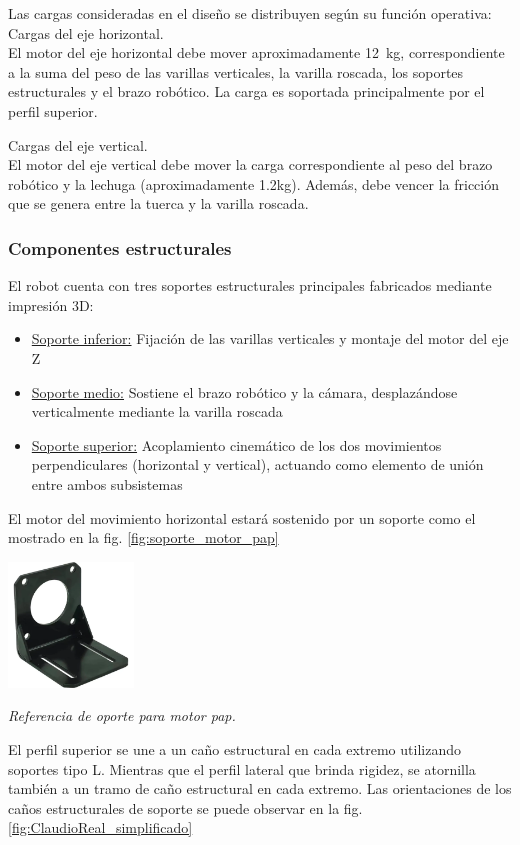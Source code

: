 Las cargas consideradas en el diseño se distribuyen según su función operativa:\\

Cargas del eje horizontal.\\
\noindent
El motor del eje horizontal debe mover aproximadamente 12~kg, correspondiente a la suma del peso de las varillas verticales, la varilla roscada, los soportes estructurales y el brazo robótico. La carga es soportada principalmente por el perfil superior.

Cargas del eje vertical.\\
\noindent
El motor del eje vertical debe mover la carga correspondiente al peso del brazo robótico y la lechuga (aproximadamente 1.2kg). Además, debe vencer la fricción que se genera entre la tuerca y la varilla roscada.

\subsubsection{Componentes estructurales}

El robot cuenta con tres soportes estructurales principales fabricados mediante impresión 3D:

\begin{itemize}[label=$\bullet$]
    \item \underline{Soporte inferior:} Fijación de las varillas verticales y montaje del motor del eje Z
    \item \underline{Soporte medio:} Sostiene el brazo robótico y la cámara, desplazándose verticalmente mediante la varilla roscada
    \item \underline{Soporte superior:} Acoplamiento cinemático de los dos movimientos perpendiculares (horizontal y vertical), actuando como elemento de unión entre ambos subsistemas
\end{itemize}

El motor del movimiento horizontal estará sostenido por un soporte como el mostrado en la fig. \ref{fig:soporte_motor_pap}
\begin{table}[H]
\centering
\includegraphics[width=0.25\textwidth]{img/soporte_motor_pap.png}
\caption{\textit{Referencia de oporte para motor pap.}}
\label{fig:soporte_motor_pap}
\end{table}
El perfil superior se une a un caño estructural en cada extremo utilizando soportes tipo L. Mientras que el perfil lateral que brinda rigidez, se atornilla también a un tramo de caño estructural en cada extremo. Las orientaciones de los caños estructurales de soporte se puede observar en la fig. \ref{fig:ClaudioReal_simplificado}